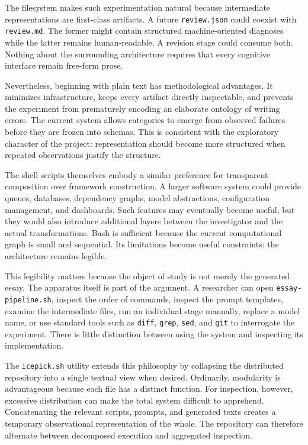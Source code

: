 \documentclass[11pt]{article}
\begin{document}
The filesystem makes such experimentation natural because intermediate representations are first-class artifacts. A future \texttt{review.json} could coexist with \texttt{review.md}. The former might contain structured machine-oriented diagnoses while the latter remains human-readable. A revision stage could consume both. Nothing about the surrounding architecture requires that every cognitive interface remain free-form prose.

Nevertheless, beginning with plain text has methodological advantages. It minimizes infrastructure, keeps every artifact directly inspectable, and prevents the experiment from prematurely encoding an elaborate ontology of writing errors. The current system allows categories to emerge from observed failures before they are frozen into schemas. This is consistent with the exploratory character of the project: representation should become more structured when repeated observations justify the structure.

The shell scripts themselves embody a similar preference for transparent composition over framework construction. A larger software system could provide queues, databases, dependency graphs, model abstractions, configuration management, and dashboards. Such features may eventually become useful, but they would also introduce additional layers between the investigator and the actual transformations. Bash is sufficient because the current computational graph is small and sequential. Its limitations become useful constraints: the architecture remains legible.

This legibility matters because the object of study is not merely the generated essay. The apparatus itself is part of the argument. A researcher can open \texttt{essay-pipeline.sh}, inspect the order of commands, inspect the prompt templates, examine the intermediate files, run an individual stage manually, replace a model name, or use standard tools such as \texttt{diff}, \texttt{grep}, \texttt{sed}, and \texttt{git} to interrogate the experiment. There is little distinction between using the system and inspecting its implementation.

The \texttt{icepick.sh} utility extends this philosophy by collapsing the distributed repository into a single textual view when desired. Ordinarily, modularity is advantageous because each file has a distinct function. For inspection, however, excessive distribution can make the total system difficult to apprehend. Concatenating the relevant scripts, prompts, and generated texts creates a temporary observational representation of the whole. The repository can therefore alternate between decomposed execution and aggregated inspection.
\end{document}
